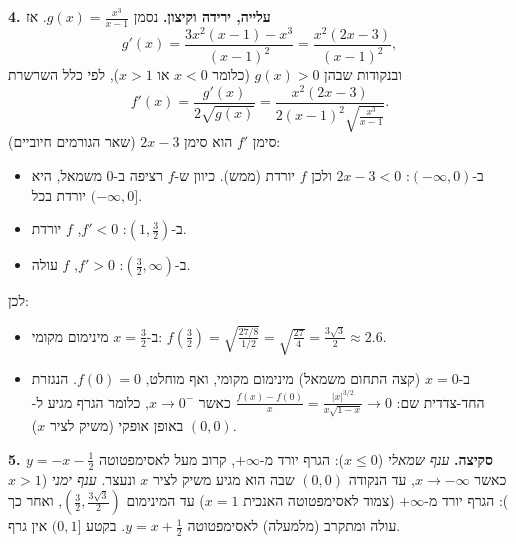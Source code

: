 \begin{solution}
\textbf{4. עלייה, ירידה וקיצון.} נסמן $g(x)=\frac{x^3}{x-1}$. אז
\[ g'(x)=\frac{3x^2(x-1)-x^3}{(x-1)^2}=\frac{x^2(2x-3)}{(x-1)^2}, \]
ובנקודות שבהן $g(x)>0$ (כלומר $x<0$ או $x>1$), לפי כלל השרשרת
\[ f'(x)=\frac{g'(x)}{2\sqrt{g(x)}}=\frac{x^2(2x-3)}{2(x-1)^2\sqrt{\frac{x^3}{x-1}}}. \]
סימן $f'$ הוא סימן $2x-3$ (שאר הגורמים חיוביים):
\begin{itemize}
  \item ב-$(-\infty,0)$: $2x-3<0$ ולכן $f$ יורדת (ממש). כיוון ש-$f$ רציפה ב-$0$ משמאל, היא יורדת בכל $(-\infty,0]$.
  \item ב-$\left(1,\frac32\right)$: $f'<0$, $f$ יורדת.
  \item ב-$\left(\frac32,\infty\right)$: $f'>0$, $f$ עולה.
\end{itemize}
לכן:
\begin{itemize}
  \item ב-$x=\frac32$ מינימום מקומי: $f\left(\frac32\right)=\sqrt{\frac{27/8}{1/2}}=\sqrt{\frac{27}{4}}=\frac{3\sqrt3}{2}\approx2.6$.
  \item ב-$x=0$ (קצה התחום משמאל) מינימום מקומי, ואף מוחלט, $f(0)=0$. הנגזרת החד-צדדית שם: $\frac{f(x)-f(0)}{x}=\frac{|x|^{3/2}}{x\sqrt{1-x}}\to0$ כאשר $x\to0^-$, כלומר הגרף מגיע ל-$(0,0)$ באופן אופקי (משיק לציר $x$).
\end{itemize}

\textbf{5. סקיצה.} \emph{ענף שמאלי} ($x\le0$): הגרף יורד מ-$+\infty$, קרוב מעל לאסימפטוטה $y=-x-\frac12$ כאשר $x\to-\infty$, עד הנקודה $(0,0)$ שבה הוא מגיע משיק לציר $x$ ונעצר. \emph{ענף ימני} ($x>1$): הגרף יורד מ-$+\infty$ (צמוד לאסימפטוטה האנכית $x=1$) עד המינימום $\left(\frac32,\frac{3\sqrt3}{2}\right)$, ואחר כך עולה ומתקרב (מלמעלה) לאסימפטוטה $y=x+\frac12$. בקטע $(0,1]$ אין גרף.
\end{solution}
